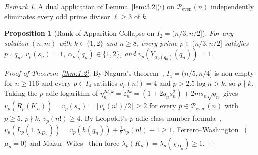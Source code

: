 \documentclass[11pt,reqno]{amsart}
\newtheorem{proposition}[theorem]{Proposition}
\theoremstyle{remark}
\newtheorem{remark}[theorem]{Remark}
\newcommand{\Peven}{\mathcal{P}_{\mathrm{even}}}
\begin{document}
\begin{remark}\label{rem:3.3}
A dual application of Lemma~\ref{lem:3.2}(i) on $\Peven(n)$ independently eliminates every odd prime divisor $\ell \ge 3$ of $k$.
\end{remark}

\begin{proposition}[{Rank-of-Apparition Collapse on $I_2 = (n/3, n/2]$}]\label{prop:3.4}
For any solution $(n, m)$ with $k \in \{1, 2\}$ and $n \ge 8$, every prime $p \in (n/3, n/2]$ satisfies $p \nmid q_n$, $v_p(s_n) = 1$, $\alpha_p(q_n) \in \{1, 2\}$, and $v_p(Y_{\alpha_p(q_n)}(q_n)) = 1$.
\end{proposition}

\begin{proof}[Proof of Theorem~\ref{thm:1.2}]
By Nagura's theorem~\cite{Nagura1952}, $I_4 = (n/5, n/4]$ is non-empty for $n \ge 116$ and every $p \in I_4$ satisfies $v_p(n!) = 4$ and $p > 2.5\log n > k$, so $p \nmid k$. Taking the $p$-adic logarithm of $\eta_n^{2d_n k} = \varepsilon_n^{2k} = (1 + 2q_n s_n^2) + 2ms_n\sqrt{q_n}$ gives $v_p(\widetilde{R}_p(K_n)) = v_p(s_n) = \lfloor v_p(n!)/2 \rfloor \ge 2$ for every $p \in \Peven(n)$ with $p \ge 5$, $p \nmid k$, $v_p(n!) \ge 4$. By Leopoldt's $p$-adic class number formula~\cite[Theorem~5.24]{Washington1997}, $v_p(L_p(1, \chi_{D_n})) = v_p(h(q_n)) + \frac{1}{2}v_p(n!) - 1 \ge 1$. Ferrero--Washington~\cite{FerreroWashington1979} ($\mu_p = 0$) and Mazur--Wiles~\cite{MazurWiles1984} then force $\lambda_p(K_n) = \lambda_p(\chi_{D_n}) \ge 1$.
\end{proof}
\end{document}
